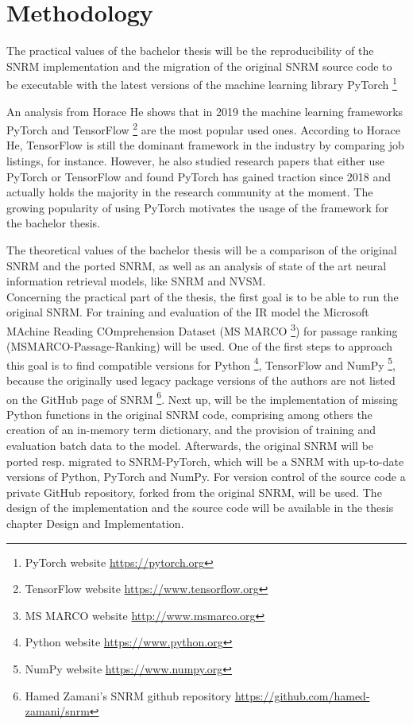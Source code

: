 \chapter{Methodology}

The practical values of the bachelor thesis will be the reproducibility of
    the SNRM implementation and the migration of the original SNRM source 
    code to be executable with the latest versions of the machine learning 
    library PyTorch \footnote{PyTorch website \url{https://pytorch.org}}  

An analysis \cite{he:2019:state-of-ml-frameworks} from Horace He shows that 
    in 2019 the machine learning frameworks PyTorch and TensorFlow 
    \footnote{TensorFlow website \url{https://www.tensorflow.org}}
    are the most popular used ones.
According to Horace He, TensorFlow is still the dominant framework
    in the industry by comparing job listings, for instance.
However, he also studied research papers that either use PyTorch or
    TensorFlow and found PyTorch has gained traction since 2018 and
    actually holds the majority in the research community at the moment.
    \cite{he:2019:state-of-ml-frameworks}
The growing popularity of using PyTorch motivates the usage of the 
    framework for the bachelor thesis.

The theoretical values of the bachelor thesis will be a comparison of 
    the original SNRM and the ported SNRM, as well as an analysis 
    of state of the art neural information retrieval models, 
    like SNRM and NVSM.\\
Concerning the practical part of the thesis, the first goal is to be able 
    to run the original SNRM.
For training and evaluation of the IR model the 
    Microsoft MAchine Reading COmprehension Dataset (MS MARCO 
    \footnote{MS MARCO website \url{http://www.msmarco.org}}) 
    for passage ranking (MSMARCO-Passage-Ranking) will be used.
One of the first steps to approach this goal is to find compatible
    versions for Python \footnote{Python website \url{https://www.python.org}}, 
    TensorFlow and NumPy \footnote{NumPy website \url{https://www.numpy.org}},
    because the originally used legacy package versions of the authors are not
    listed on the GitHub page of SNRM 
    \footnote{Hamed Zamani's SNRM github repository \url{https://github.com/hamed-zamani/snrm}}.
Next up, will be the implementation of missing Python functions in the original SNRM code, 
    comprising among others the creation of an in-memory term dictionary, 
    and the provision of training and evaluation batch data to the model.
Afterwards, the original SNRM will be ported resp. migrated to SNRM-PyTorch, 
    which will be a SNRM with up-to-date versions of Python, PyTorch and NumPy.
For version control of the source code a private GitHub repository, forked from 
    the original SNRM, will be used.
The design of the implementation and the source code will be available in the thesis
    chapter Design and Implementation.

